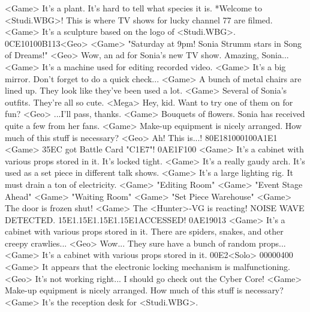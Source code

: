 <Game> It's a plant. It's hard to tell what species it is. 
*Welcome to <Studi.WBG>! 
This is where TV shows for lucky channel 77 are filmed. 
<Game> It's a sculpture based on the logo of <Studi.WBG>. 
{0C}{E1}{01}{00}{B1}{13}<Geo>
<Game> "Saturday at 9pm! Sonia Strumm stars in Song of Dreams!" 
<Geo> Wow, an ad for Sonia's new TV show. Amazing, Sonia... 
<Game> It's a machine used for editing recorded video. 
<Game> It's a big mirror. Don't forget to do a quick check... 
<Game> A bunch of metal chairs are lined up. They look like they've been used a lot. 
<Game> Several of Sonia's outfits. They're all so cute. 
<Mega> Hey, kid. Want to try one of them on for fun? 
<Geo> ...I'll pass, thanks. 
<Game> Bouquets of flowers. Sonia has received quite a few from her fans. 
<Game> Make-up equipment is nicely arranged. How much of this stuff is necessary? 
<Geo> Ah! This is...! 
{80}{E1}{81}{00}{01}{00}{A1}{E1} 
<Game> {35}{EC} got Battle Card "{C1}{E7}"! 
{0A}{E1}{F1}{00}
<Game> It's a cabinet with various props stored in it. It's locked tight. 
<Game> It's a really gaudy arch. It's used as a set piece in different talk shows. 
<Game> It's a large lighting rig. It must drain a ton of electricity. 
<Game> "Editing Room" 
<Game> "Event Stage Ahead" 
<Game> "Waiting Room" 
<Game> "Set Piece Warehouse" 
<Game> The door is frozen shut! 
<Game> The <Hunter>-VG is reacting! 
NOISE WAVE DETECTED. {15}{E1}.{15}{E1}.{15}{E1}.{15}{E1}ACCESSED! 
{0A}{E1}{90}{13}
<Game> It's a cabinet with various props stored in it. 
There are spiders, snakes, and other creepy crawlies... 
<Geo> Wow... They sure have a bunch of random props... 
<Game> It's a cabinet with various props stored in it. 
{00}{E2}<Solo> {00}{00}{04}{00} 
<Game> It appears that the electronic locking mechanism is malfunctioning. 
<Geo> It's not working right... I should go check out the Cyber Core! 
<Game> Make-up equipment is nicely arranged. How much of this stuff is necessary? 
<Game> It's the reception desk for <Studi.WBG>. 

